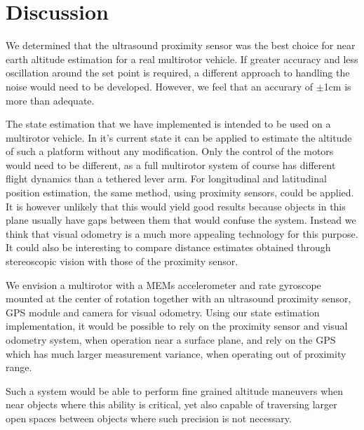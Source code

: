 \section{Discussion}\label{sec:discussion}
We determined that the ultrasound proximity sensor was the best choice for near earth altitude estimation for a real multirotor 
vehicle. If greater accuracy and less oscillation around the set point is required, a different approach to handling the noise would
need to be developed. However, we feel that an accurary of \(\pm\)1cm is more
than adequate.

The state estimation that we have implemented is intended to be used on a multirotor vehicle. In it's current state it can be applied
to estimate the altitude of such a platform without any modification. Only the control of the motors would need to be different, as 
a full multirotor system 
of course has different flight dynamics than a tethered lever arm. For longitudinal and latitudinal position estimation, the same method,
using proximity sensors, could be applied. It is however unlikely that this would yield good results because objects in this plane usually
have gaps between them that would confuse the system. Instead we think that visual odometry\cite{Nister2004} is a much more
appealing technology for this
purpose. It could also be interesting to compare distance estimates obtained through stereoscopic vision with those of the proximity sensor.

We envision a multirotor with a MEMs accelerometer and rate gyroscope
mounted at the center of rotation together with an ultrasound proximity sensor, GPS module and camera for visual odometry.
Using our state estimation implementation,
it would be possible to rely on the proximity sensor and visual odometry system, when operation near a surface plane, and rely
on the GPS which has much larger 
measurement variance, when operating out of proximity range.

Such a system would be able to perform fine grained altitude maneuvers when near objects where this ability is critical, yet also capable
of traversing larger open spaces between objects where such precision is not necessary.
